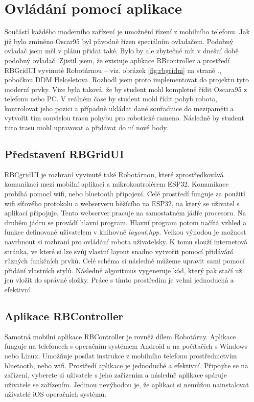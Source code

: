 \section{Ovládání pomocí aplikace}
Součástí každého moderního zařízení je umožnění řízení z mobilního telefonu. Jak již bylo zmíněno Oscar95 byl původně řízen speciálním ovladačem. Podobný ovladač jsem měl v plánu přidat také. Bylo by ale zbytečné mít v dnešní době podobný ovladač. Zjistil jsem, že existuje aplikace RBcontroller a prostředí RBGridUI vyvinuté Robotárnou -- viz. obrázek \ref{fig:rbgridui}  na straně 
\pageref{fig:rbgridui}., pobočkou DDM Helceletova. Rozhodl jsem proto implementovat do projektu tyto moderní prvky. Vize byla taková, že by student mohl kompletně řídit Oscara95 z telefonu nebo PC. V reálném čase by student mohl řídit pohyb robota, kontrolovat jeho pozici a případně ukládat dané souřadnice do mezipaměti a vytvořit tím souvislou trasu pohybu pro robotické rameno. Následně by student tuto trasu mohl upravovat a přidávat do ní nové body. \cite{RBController}


\subsection{Představení RBGridUI}
RBCgridUI je rozhraní vyvinuté také Robotárnou, které zprostředkovává 
komunikaci mezi mobilní aplikací a mikrokontrolérem ESP32. Komunikace probíhá 
pomocí wifi, nebo bluetooth připojení. Celé prostředí funguje za použití wifi síťového protokolu a webserveru běžícího na ESP32, na který 
se uživatel s aplikací připojuje. Tento webserver pracuje na samostatném jádře procesoru. Na 
druhém jádru se provádí hlavní program. Hlavní program potom načítá vzhled a funkce 
definované uživatelem v knihovně \textit{layout.hpp}. Velkou výhodou je možnost navrhnout si rozhraní pro ovládání robota uži\-va\-tel\-sky. K tomu slouží internetová stránka, ve které si lze svůj vlastní layout snadno vytvořit 
pomocí přidávání různých funkčních prvků. Celé schéma si následně můžeme upravit sami 
pomocí přidání vlastních stylů. Následně algoritmus vygeneruje kód, který pak stačí už jen vložit 
do správné složky. Práce s tímto prostředím je velmi jednoduchá a efektivní. \cite{RBGridUI}

\subsection{Aplikace RBController}
Samotná mobilní aplikace RBController je rovněž dílem Robotárny. Aplikace funguje na telefonech s operačním systémem Android a na počítačích s Windows nebo Linux. Umožňuje posílat instrukce z mobilního telefonu prostřednictvím bluetooth, nebo wifi. Prostředí aplikace je jednoduché a efektivní. Připojíte se na zařízení, vyberete si uživatele s jeho zařízením a následně aplikace spáruje uživatele se zařízením. Jedinou nevýhodou je, že aplikaci si nemůžou nainstalovat uživatelé iOS operačních systémů.  \cite{RBController}

